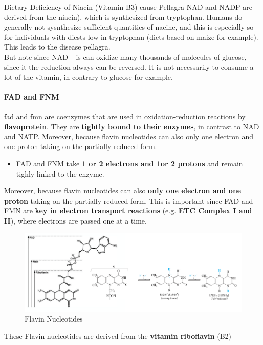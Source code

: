 \documentclass[../main.tex]{subfiles}
\begin{document}
\begin{RemarkWithTitel}{Dietary Deficiency of Niacin (Vitamin B3) cause Pellagra}
	NAD and NADP are derived from the \gls{niacin}), which is synthesized from tryptophan. Humans do generally not sysnthesize sufficient quantities of nacine, and this is especially so for individuals with diests low in tryptophan (diets based on maize for example). This leads to the disease pellagra. \\
	But note since NAD+ is can oxidize many thousands of molecules of glucose, since it the reduction always can be reversed. It is not necessarily to consume a lot of the vitamin, in contrary to glucose for example.  
\end{RemarkWithTitel}


\paragraph{FAD and FNM}
\gls{fad} and \gls{fmn} are coenzymes that are used in oxidation-reduction reactions by \textbf{\gls{flavoprotein}}. They are \textbf{tightly bound to their enzymes}, in contrast to NAD and NATP. Moreover, because flavin nucleotides can also only one electron and one proton taking on the partially reduced form. 
\begin{itemize}
	\item FAD and FNM take \textbf{1 or 2 electrons and 1or 2 protons} and remain tighly linked to the enzyme.
\end{itemize}
 Moreover, because flavin nucleotides can also \textbf{only one electron and one proton} taking on the partially reduced form. This is important since FAD and FMN are \textbf{key in electron transport reactions} (e.g. \textbf{ETC Complex I and II}), where electrons are passed one at a time. 

\begin{figure}[H]
	\centering
	\includegraphics[width = 0.9 \textwidth]{FAD}
	\caption{Flavin Nucleotides}
\end{figure}
These Flavin nucleotides are derived from the \textbf{vitamin riboflavin} (B2)
\end{document}
